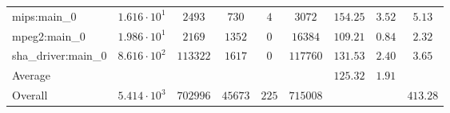 \begin{tabular}{|l|c|c|c|c|c|c|c|c|}
mips:main\_0            & $ 1.616 \cdot 10^{1}  $ & $ 2493   $ & $ 730   $ & $ 4   $ & $ 3072   $ & $ 154.25      $ & $ 3.52    $ & $ 5.13    $ \\
mpeg2:main\_0           & $ 1.986 \cdot 10^{1}  $ & $ 2169   $ & $ 1352  $ & $ 0   $ & $ 16384  $ & $ 109.21      $ & $ 0.84    $ & $ 2.32    $ \\
sha\_driver:main\_0     & $ 8.616 \cdot 10^{2}  $ & $ 113322 $ & $ 1617  $ & $ 0   $ & $ 117760 $ & $ 131.53      $ & $ 2.40    $ & $ 3.65    $ \\
\hline
Average                 & $                     $ & $        $ & $       $ & $     $ & $        $ & $ 125.32      $ & $ 1.91    $ & $         $ \\
\hline
Overall                 & $ 5.414 \cdot 10^{3}  $ & $ 702996 $ & $ 45673 $ & $ 225 $ & $ 715008 $ & $             $ & $         $ & $ 413.28  $ \\
\hline
\end{tabular}
